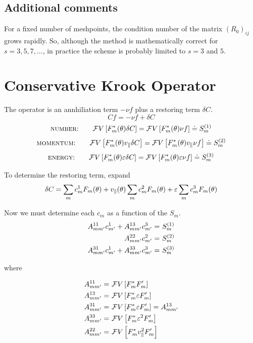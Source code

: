 \subsection{Additional comments}

For a fixed number of meshpoints, the condition number of the 
matrix $(R_0)_{ij}$ grows rapidly.  So, although the method is 
mathematically correct for $s=3,5,7,\ldots$, in practice the 
scheme is probably limited to $s=3$ and $5$.

\section{Conservative Krook Operator}

The operator is an annhiliation term $-\nu f$ plus a 
restoring term $\delta C$.
%
\begin{equation}
C f = -\nu f + \delta C 
\end{equation}
%
\begin{equation}
\mbox{{\sc number}:} \qquad {\cal F}V \left[ F_m^*(\theta) \delta C \right] 
= {\cal F}V \left[ F_m^*(\theta) \nu f \right] \doteq S_m^{(1)}
\end{equation}
\begin{equation}
\mbox{{\sc momentum}:} \qquad {\cal F}V 
 \left[ F_m^*(\theta) v_\parallel \delta C \right] 
= {\cal F}V \left[ F_m^*(\theta) v_\parallel \nu f \right] \doteq S_m^{(2)}
\end{equation}
\begin{equation}
\mbox{{\sc energy}:} \qquad {\cal F}V \left[ F_m^*(\theta) 
 {\varepsilon} \delta C \right] 
= {\cal F}V \left[ F_m^*(\theta) {\varepsilon} \nu f \right] \doteq S_m^{(3)}
\end{equation}

\noindent
To determine the restoring term, expand
%
\begin{equation}
\delta C = \sum_m c_m^1 F_m(\theta)
+ v_\parallel(\theta)\sum_m c_m^2 F_m(\theta) 
+ {\varepsilon} \sum_m c_m^3 F_m(\theta) 
\end{equation}

\noindent
Now we must determine each $c_m$ as a function of the $S_m$.
%
\begin{align}
A^{11}_{mm^\prime} c^1_{m^\prime} + A^{13}_{mm^\prime} c^3_{m^\prime} = &~S_m^{(1)} \\
                          A^{22}_{mm^\prime} c^2_{m^\prime} = &~S_m^{(2)} \\
A^{31}_{mm^\prime} c^1_{m^\prime} + A^{33}_{mm^\prime} c^3_{m^\prime} = &~S_m^{(3)}
\end{align}

where

\begin{align}
A^{11}_{mm^\prime} = &~{\cal F}V\left[ F_m^* F_m^\prime \right] \\
A^{13}_{mm^\prime} = &~{\cal F}V\left[ F_m^* {\varepsilon} F_m^\prime \right] \\
A^{31}_{mm^\prime} = &~{\cal F}V\left[ F_m^* {\varepsilon} F_m^\prime \right] = A^{13}_{mm^\prime} \\
A^{33}_{mm^\prime} = &~{\cal F}V\left[ F_m^* {\varepsilon}^2 F_m^\prime \right] \\
A^{22}_{mm^\prime} = &~{\cal F}V\left[ F_m^* v_\parallel^2 F_m^\prime \right]
\end{align}

